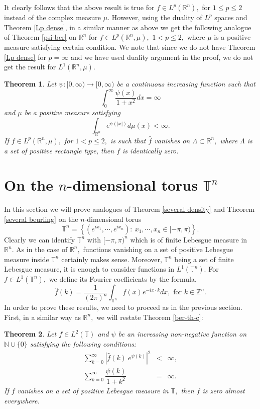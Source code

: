\documentclass [11pt]{amsart}
\newtheorem{Thm}{Theorem}[section]
\newcommand{\R}{\mathbb R}
\newcommand{\T}{\mathbb T}
\newcommand{\N}{\mathbb N}
\newcommand{\Z}{\mathbb Z}
\newcommand{\beas} {\begin{eqnarray*}}
\newcommand{\eeas} {\end{eqnarray*}}
\numberwithin{equation}{section}
\begin{document}
It clearly follows that the above result is true for $f\in L^p(\R^n),$ for $1 \leq p \leq 2$ instead of the complex measure $\mu.$ However, using the duality of $L^p$ spaces and Theorem \ref{Lp dense}, in a similar manner as above we get the following analogue of Theorem \ref{psi-ber} on $\R^n$ for $f \in L^p(\R^n,\mu),$ $1 < p \leq 2,$ where $\mu$ is a positive measure satisfying certain condition. We note that since we do not have Theorem \ref{Lp dense} for $p = \infty$ and we have used duality argument in the proof, we do not get the result for $L^1(\R^n,\mu).$ 
\begin{Thm} \label{beurlinglp}
Let $\psi:[0,\infty)\rightarrow [0,\infty)$ be a continuous increasing function such that 
$$\int_0^\infty\dfrac{\psi(x)}{1+x^2}dx=\infty$$ 
and $\mu$ be a positive measure satisfying 
$$ \int_{\R^n} e^{\psi(|x|)}d\mu(x)<\infty.$$
If $f\in L^p(\R^n,\mu),$ for $1<p\leq 2,$ is such that $\widehat{f}$ vanishes on $\Lambda\subset \R^n,$ where $\Lambda$ is a set of positive rectangle type, then $f$ is identically zero. 
\end{Thm}



\section{On the $n$-dimensional torus $\T^n$}

In this section we will prove analogues of Theorem \ref{several density} and Theorem \ref{several beurling} on the $n$-dimensional torus
$$\T^n=\left\{\left(e^{ix_1}, \cdots , e^{ix_n}\right):~ x_1, \cdots ,x_n\in [-\pi,\pi)\right\}.$$ Clearly we can identify $\T^n$ with $[-\pi,\pi)^n$ which is of finite Lebesgue measure in $\R^n.$ As in the case of $\R^n,$ functions vanishing on a set of positive Lebesgue measure inside $\T^n$ certainly makes sense. Moreover, $\T^n$ being a set of finite Lebesgue measure, it is enough to consider functions in $L^1(\T^n).$ For $f\in L^1(\T^n),$ we define its Fourier coefficients by the formula,
$$ \widehat{f}(k)= \frac{1}{(2\pi)^n}\int_{\T^n}f(x)e^{-ix\cdot k}dx, \text{ for } k\in \Z^n.$$ In order to prove these results, we need to proceed as in the previous section. First, in a similar way as $\R^n,$ we will restate Theorem \ref{ber-th-c}:

\begin{Thm}\label{psi-ber-c}
Let $f\in L^2(\T)$ and $\psi$ be an increasing non-negative function on $\N \cup \{0\}$ satisfying the following conditions:
\beas
\sum_{k=0}^\infty|\widehat{f}(k) ~ e^{\psi(k)} |^2 &<& \infty,  \\
\sum_{k=0}^\infty\dfrac{\psi(k)}{1+k^2} &=& \infty.
\eeas
If $f$ vanishes on a set of positive Lebesgue measure in $\T,$ then $f$ is zero almost everywhere.
\end{Thm}
\end{document}
